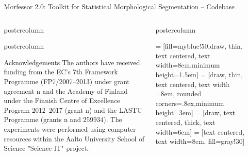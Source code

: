 \documentclass[final]{beamer} %
\begin{document}
\begin{frame}{Morfessor 2.0: Toolkit for Statistical Morphological Segmentation -- Codebase}
\begin{columns}
\begin{column}{.3\textwidth}
\begin{beamercolorbox}[center,wd=\textwidth]{postercolumn}
	\end{beamercolorbox}
	  \begin{beamercolorbox}[center,wd=\textwidth]{postercolumn}
	 \begin{block}{Acknowledgements}
\footnotesize
The authors have received funding from the
EC's 7th Framework Programme (FP7/2007--2013)
under
grant agreement n and the Academy of Finland under
the Finnish Centre of Excellence Program 2012--2017 (grant
n) and the LASTU Programme (grants n and 259934). 
The experiments were performed using computer resources within the Aalto University School of Science "Science-IT" project.    
	            \end{block}
	            
		\end{beamercolorbox}


\end{column}
\begin{column}{.35\textwidth}


  \begin{beamercolorbox}[center,wd=\textwidth]{postercolumn}
 \begin{block}{}
 = [fill=myblue!50,draw, thin, text centered, text width=8em,minimum height=1.5em]
 = [draw, thin, text centered, text width =8em, rounded corners=.8ex,minimum height=3em]
 = [draw, text centered, thick, text width=6em]
 = [text centered, text width=8em, fill=gray!30]


\end{block}
\end{beamercolorbox}
\end{column}
\end{columns}
\end{frame}
\end{document}
